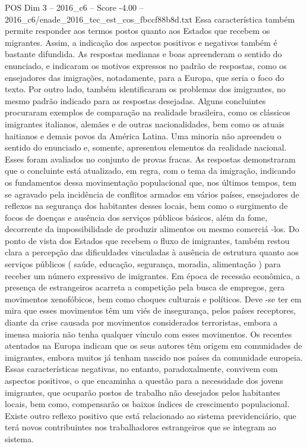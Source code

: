 \begin{textsample}{POS Dim 3 – 2016\_c6 – Score -4.00 – 2016\_c6/enade\_2016\_tec\_est\_cos\_fbccf88b8d.txt}
Essa característica também permite responder aos termos postos quanto aos Estados que recebem os migrantes.
Assim, a indicação dos aspectos positivos e negativos também é bastante difundida.
As respostas medianas e boas apreenderam o sentido do enunciado, e indicaram os motivos expressos no padrão de respostas, como os ensejadores das imigrações, notadamente, para a Europa, que seria o foco do texto.
Por outro lado, também identificaram os problemas dos imigrantes, no mesmo padrão indicado para as respostas desejadas.
Alguns concluintes procuraram exemplos de comparação na realidade brasileira, como os clássicos imigrantes italianos, alemães e de outras nacionalidades, bem como os atuais haitianos e demais povos da América Latina.
Uma minoria não apreendeu o sentido do enunciado e, somente, apresentou elementos da realidade nacional.
Esses foram avaliados no conjunto de provas fracas.
As respostas demonstraram que o concluinte está atualizado, em regra, com o tema da imigração, indicando os fundamentos dessa movimentação populacional que, nos últimos tempos, tem se agravado pela incidência de conflitos armados em vários países, ensejadores de reflexos na segurança dos habitantes desses locais, bem como o surgimento de focos de doenças e ausência dos serviços públicos básicos, além da fome, decorrente da impossibilidade de produzir alimentos ou mesmo comerciá -los.
Do ponto de vista dos Estados que recebem o fluxo de imigrantes, também restou clara a percepção das dificuldades vinculadas à ausência de estrutura quanto aos serviços públicos ( saúde, educação, segurança, moradia, alimentação ) para receber um número expressivo de imigrantes.
Em época de recessão econômica, a presença de estrangeiros acarreta a competição pela busca de empregos, gera movimentos xenofóbicos, bem como choques culturais e políticos.
Deve -se ter em mira que esses movimentos têm um viés de insegurança, pelos países receptores, diante da crise causada por movimentos considerados terroristas, embora a imensa maioria não tenha qualquer vínculo com esses movimentos.
Os recentes atentados na Europa indicam que os seus autores têm origem em comunidades de imigrantes, embora muitos já tenham nascido nos países da comunidade europeia.
Essas características negativas, no entanto, paradoxalmente, convivem com aspectos positivos, o que encaminha a questão para a necessidade dos jovens imigrantes, que ocuparão postos de trabalho não desejados pelos habitantes locais, bem como, compensarão os baixos índices de crescimento populacional.
Existe outro reflexo positivo que está relacionado ao sistema previdenciário, que terá novos contribuintes nos trabalhadores estrangeiros que se integram ao sistema.

\end{textsample}
